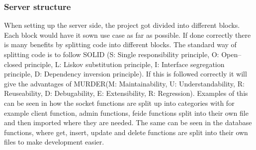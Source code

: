 \subsubsection{Server structure}
When setting up the server side, the project got divided into different blocks. Each block would have it sown use case as far as possible. If done correctly there is many benefits by splitting code into different blocks. The standard way of splitting code is to follow SOLID (S: Single responsibility principle, O: Open–closed principle, L: Liskov substitution principle, I: Interface segregation principle, D: Dependency inversion principle). If this is followed correctly it will give the advantages of MURDER(M: Maintainability, U: Understandability, R: Reuseability, D: Debugability, E: Extensibility, R: Regression). Examples of this can be seen in how the socket functions are split up into categories with for example client function, admin functions, feide functions split into their own file and then imported where they are needed. The same can be seen in the database functions, where get, insert, update and delete functions are split into their own files to make development easier.
